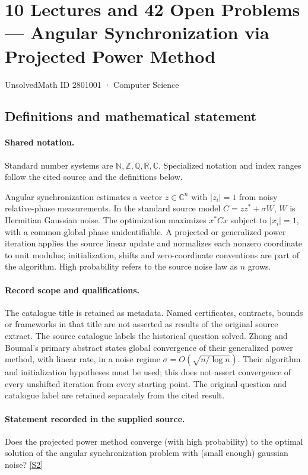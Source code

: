 \documentclass[11pt]{article}
\newcommand{\sref}[2]{\hyperlink{source:#1:#2}{[S#2]}}
\begin{document}
\setcounter{section}{2801000}
\section{10 Lectures and 42 Open Problems — Angular Synchronization via Projected Power Method}\label{2801001}
{\small\sffamily UnsolvedMath ID 2801001 · Computer Science}
\subsection{Definitions and mathematical statement}

\paragraph{Shared notation.}Standard number systems are $\mathbb N,\mathbb Z,\mathbb Q,\mathbb R,\mathbb C$. Specialized notation and index ranges follow the cited source and the definitions below.


Angular synchronization estimates a vector $z\in\mathbb C^n$ with $|z_i|=1$ from noisy relative-phase measurements. In the standard source model $C=zz^*+\sigma W$, $W$ is Hermitian Gaussian noise. The optimization maximizes $x^*Cx$ subject to $|x_i|=1$, with a common global phase unidentifiable. A projected or generalized power iteration applies the source linear update and normalizes each nonzero coordinate to unit modulus; initialization, shifts and zero-coordinate conventions are part of the algorithm. High probability refers to the source noise law as $n$ grows.
\paragraph{Record scope and qualifications.}
The catalogue title is retained as metadata. Named certificates, contracts, bounds or frameworks in that title are not asserted as results of the original source extract.
The source catalogue labels the historical question solved. Zhong and Boumal's primary abstract states global convergence of their generalized power method, with linear rate, in a noise regime $\sigma=O(\sqrt{n/\log n})$. Their algorithm and initialization hypotheses must be used; this does not assert convergence of every unshifted iteration from every starting point. The original question and catalogue label are retained separately from the cited result.
\paragraph{Statement recorded in the supplied source.}
Does the projected power method converge (with high probability) to the optimal solution of the angular synchronization problem with (small enough) gaussian noise? \sref{2801001}{2}
\end{document}
